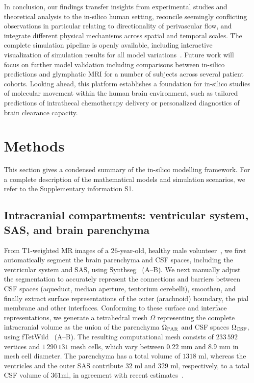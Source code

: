 \documentclass[fleqn,10pt]{wlscirep}
\begin{document}
In conclusion, our findings transfer insights from experimental
studies and theoretical analysis to the in-silico human setting,
reconcile seemingly conflicting observations in particular relating to
directionality of perivascular flow, and integrate different physical
mechanisms across spatial and temporal scales. The complete simulation
pipeline is openly available, including interactive visualization of
simulation results for all model variations~\cite{ZENODO}. Future work
will focus on further model validation including comparisons between
in-silico predictions and glymphatic MRI for a number of subjects
across several patient cohorts. Looking ahead, this platform
establishes a foundation for in-silico studies of molecular movement
within the human brain environment, such as tailored predictions of
intrathecal chemotherapy delivery or personalized diagnostics of brain
clearance capacity.


\section*{Methods}

This section gives a condensed summary of the in-silico modelling
framework. For a complete description of the mathematical models and
simulation scenarios, we refer to the Supplementary information S1.

\subsection*{Intracranial compartments: ventricular system, SAS, and brain parenchyma}

From T1-weighted MR images of a 26-year-old, healthy male volunteer~\cite{hodneland2019new},
we first automatically segment the brain parenchyma and CSF spaces,
including the ventricular system and SAS, using
Synthseg~\cite{billot2023robust,billot2023synthseg}
(A--B). We next manually adjust the segmentation to
accurately represent the connections and barriers between CSF spaces (aqueduct,
median aperture, tentorium cerebelli), smoothen, and finally extract
surface representations of the outer (arachnoid) boundary, the pial
membrane and other interfaces. Conforming to these surface and
interface representations, we generate a tetrahedral mesh $\Omega$
representing the complete intracranial volume as the union of the
parenchyma $\Omega_{\rm PAR}$ and CSF spaces $\Omega_{\rm CSF}$, using
fTetWild~\cite{hu2020fast} (A--B). The resulting
computational mesh consists of $233\,592$ vertices and $1\,290\,131$
mesh cells, which vary between $0.22$ mm and $8.9$ mm in mesh cell
diameter. The parenchyma has a total volume of $1318$ ml, whereas the
ventricles and the outer SAS contribute $32$ ml and $329$ ml,
respectively, to a total CSF volume of $361$ml, in agreement with
recent estimates~\cite{hladky2024regulation}.
\end{document}
